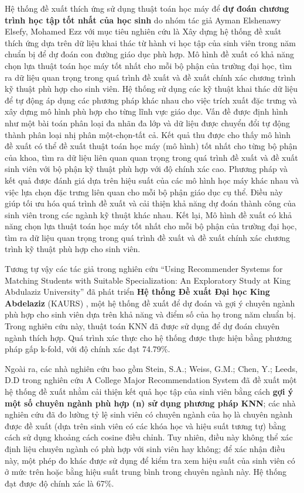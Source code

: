 Hệ thống đề xuất thích ứng sử dụng thuật toán học máy để \textbf{dự đoán chương trình học tập tốt nhất của học sinh} do nhóm tác giả Ayman Elshenawy Elsefy, Mohamed Ezz \cite{mohamed} với mục tiêu nghiên cứu là Xây dựng hệ thống đề xuất thích ứng dựa trên dữ liệu khai thác từ hành vi học tập của sinh viên trong năm chuẩn bị để dự đoán con đường giáo dục phù hợp. Mô hình đề xuất có khả năng chọn lựa thuật toán học máy tốt nhất cho mỗi bộ phận của trường đại học, tìm ra dữ liệu quan trọng trong quá trình đề xuất và đề xuất chính xác chương trình kỹ thuật phù hợp cho sinh viên. Hệ thống sử dụng các kỹ thuật khai thác dữ liệu để tự động áp dụng các phương pháp khác nhau cho việc trích xuất đặc trưng và xây dựng mô hình phù hợp cho từng lĩnh vực giáo dục. Vấn đề được định hình như một bài toán phân loại đa nhãn đa lớp và dữ liệu được chuyển đổi tự động thành phân loại nhị phân một-chọn-tất cả. Kết quả thu được cho thấy mô hình đề xuất có thể đề xuất thuật toán học máy (mô hình) tốt nhất cho từng bộ phận của khoa, tìm ra dữ liệu liên quan quan trọng trong quá trình đề xuất và đề xuất sinh viên với bộ phận kỹ thuật phù hợp với độ chính xác cao. Phương pháp và kết quả được đánh giá dựa trên hiệu suất của các mô hình học máy khác nhau và việc lựa chọn đặc trưng liên quan cho mỗi bộ phận giáo dục cụ thể. Điều này giúp tối ưu hóa quá trình đề xuất và cải thiện khả năng dự đoán thành công của sinh viên trong các ngành kỹ thuật khác nhau. Kết lại, Mô hình đề xuất có khả năng chọn lựa thuật toán học máy tốt nhất cho mỗi bộ phận của trường đại học, tìm ra dữ liệu quan trọng trong quá trình đề xuất và đề xuất chính xác chương trình kỹ thuật phù hợp cho sinh viên. 

Tương tự vậy các tác giả trong nghiên cứu “Using Recommender Systems for Matching Students with Suitable Specialization: An Exploratory Study at King Abdulaziz University” đã phát triển \textbf{Hệ thống Đề xuất Đại học King Abdelaziz} (KAURS) \cite{khloud}, một hệ thống đề xuất để dự đoán và gợi ý chuyên ngành phù hợp cho sinh viên dựa trên khả năng và điểm số của họ trong năm chuẩn bị. Trong nghiên cứu này, thuật toán KNN đã được sử dụng để dự đoán chuyên ngành thích hợp. Quá trình xác thực cho hệ thống được thực hiện bằng phương pháp gấp k-fold, với độ chính xác đạt 74.79\%.

Ngoài ra, các nhà nghiên cứu bao gồm Stein, S.A.; Weiss, G.M.; Chen, Y.; Leeds, D.D trong nghiên cứu A College Major Recommendation System \cite{researchgate} đã đề xuất một hệ thống đề xuất nhằm cải thiện kết quả học tập của sinh viên bằng cách \textbf{gợi ý một số chuyên ngành phù hợp (n) sử dụng phương pháp KNN}; các nhà nghiên cứu đã đo lường tỷ lệ sinh viên có chuyên ngành của họ là chuyên ngành được đề xuất (dựa trên sinh viên có các khóa học và hiệu suất tương tự) bằng cách sử dụng khoảng cách cosine điều chỉnh. Tuy nhiên, điều này không thể xác định liệu chuyên ngành có phù hợp với sinh viên hay không; để xác nhận điều này, một phép đo khác được sử dụng để kiểm tra xem hiệu suất của sinh viên có ở mức trên hoặc bằng hiệu suất trung bình trong chuyên ngành này. Hệ thống đạt được độ chính xác là 67\%.

